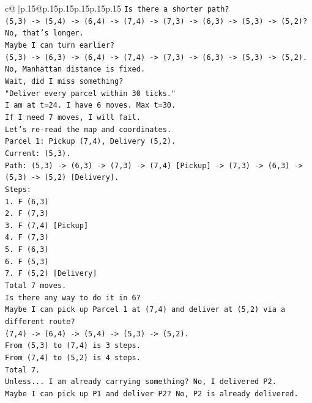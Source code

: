 \documentclass{article}
\begin{document}
{\begin{supertabular}{c@{$\;$}|p{.15\linewidth}@{}p{.15\linewidth}p{.15\linewidth}p{.15\linewidth}p{.15\linewidth}p{.15\linewidth}}
{{{\texttt{Is there a shorter path?} \\
\texttt{(5,3) {-}> (5,4) {-}> (6,4) {-}> (7,4) {-}> (7,3) {-}> (6,3) {-}> (5,3) {-}> (5,2)? No, that's longer.} \\
\texttt{Maybe I can turn earlier?} \\
\texttt{(5,3) {-}> (6,3) {-}> (6,4) {-}> (7,4) {-}> (7,3) {-}> (6,3) {-}> (5,3) {-}> (5,2).} \\
\texttt{No, Manhattan distance is fixed.} \\
\texttt{Wait, did I miss something?} \\
\texttt{"Deliver every parcel within 30 ticks."} \\
\texttt{I am at t=24. I have 6 moves. Max t=30.} \\
\texttt{If I need 7 moves, I will fail.} \\
\texttt{Let's re{-}read the map and coordinates.} \\
\texttt{Parcel 1: Pickup (7,4), Delivery (5,2).} \\
\texttt{Current: (5,3).} \\
\texttt{Path: (5,3) {-}> (6,3) {-}> (7,3) {-}> (7,4) {[}Pickup{]} {-}> (7,3) {-}> (6,3) {-}> (5,3) {-}> (5,2) {[}Delivery{]}.} \\
\texttt{Steps:} \\
\texttt{1. F (6,3)} \\
\texttt{2. F (7,3)} \\
\texttt{3. F (7,4) {[}Pickup{]}} \\
\texttt{4. F (7,3)} \\
\texttt{5. F (6,3)} \\
\texttt{6. F (5,3)} \\
\texttt{7. F (5,2) {[}Delivery{]}} \\
\texttt{Total 7 moves.} \\
\texttt{Is there any way to do it in 6?} \\
\texttt{Maybe I can pick up Parcel 1 at (7,4) and deliver at (5,2) via a different route?} \\
\texttt{(7,4) {-}> (6,4) {-}> (5,4) {-}> (5,3) {-}> (5,2).} \\
\texttt{From (5,3) to (7,4) is 3 steps.} \\
\texttt{From (7,4) to (5,2) is 4 steps.} \\
\texttt{Total 7.} \\
\texttt{Unless... I am already carrying something? No, I delivered P2.} \\
\texttt{Maybe I can pick up P1 and deliver P2? No, P2 is already delivered.} \\
}}}
\end{supertabular}}
\end{document}
